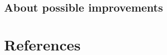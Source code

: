 \documentclass[twocolumn,superscriptaddress,aps]{revtex4-1}
\begin{document}
\subsection{About possible improvements}




\newpage
\section{References}



\end{document}
